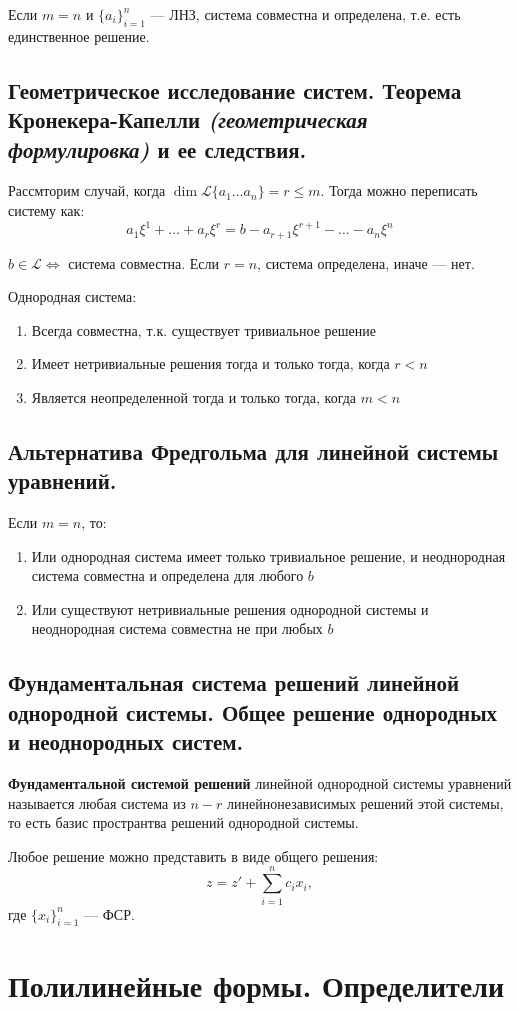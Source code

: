 \begin{theorem}
    Если $m=n$ и $\{a_i\}_{i=1}^n$ --- ЛНЗ, система совместна и определена, т.е. есть единственное решение.
\end{theorem}
\subsection{Геометрическое исследование систем. Теорема Кронекера-Капелли \textit{(геометрическая формулировка)} и ее следствия.}
Рассмторим случай, когда $\dim\mathcal{L}\{a_1\ldots a_n\}=r\leq m$. Тогда можно переписать систему как: $$a_1\xi^1+\ldots+a_r\xi^r=b-a_{r+1}\xi^{r+1}-\ldots-a_n\xi^n$$
\begin{theorem}
    $b\in\mathcal L \Leftrightarrow$ система совместна. Если $r=n$, система определена, иначе --- нет.
\end{theorem}
\begin{consequence}
    Однородная система:
    \begin{enumerate}
        \item Всегда совместна, т.к. существует тривиальное решение
        \item Имеет нетривиальные решения тогда и только тогда, когда $r<n$
        \item Является неопределенной тогда и только тогда, когда $m<n$
    \end{enumerate}
\end{consequence}
\subsection{Альтернатива Фредгольма для линейной системы уравнений.}
\begin{theorem}
    Если $m=n$, то:
    \begin{enumerate}
        \item Или однородная система имеет только тривиальное решение, и неоднородная система совместна и определена для любого $b$
        \item Или существуют нетривиальные решения однородной системы и неоднородная система совместна не при любых $b$
    \end{enumerate}
\end{theorem}
\subsection{Фундаментальная система решений линейной однородной системы. Общее решение однородных и неоднородных систем.}
\begin{definition}
    \textbf{Фундаментальной системой решений} линейной однородной системы уравнений называется любая система из $n − r$ линейнонезависимых решений этой системы, то есть базис пространтва решений однородной системы.
\end{definition}
Любое решение можно представить в виде общего решения: $$z=z'+\sum\limits_{i=1}^n c_ix_i,$$ где $\{x_i\}_{i=1}^n$ --- ФСР.

\section{Полилинейные формы. Определители}
